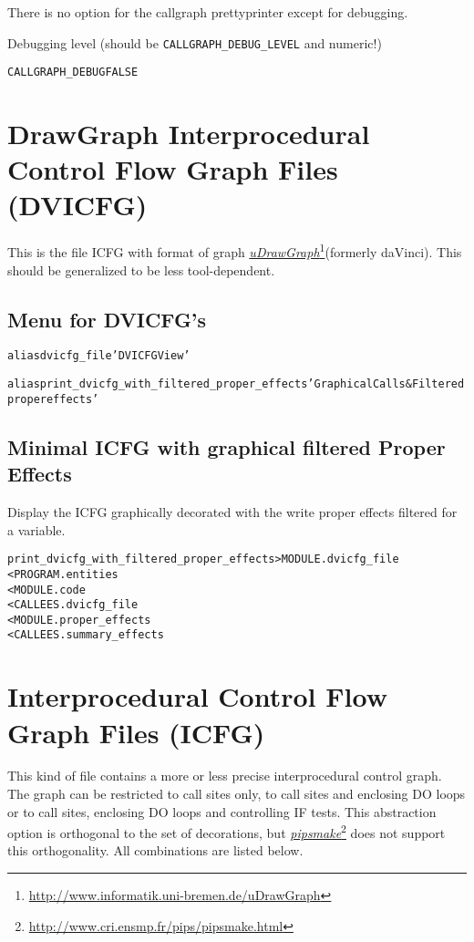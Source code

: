 \documentclass[a4paper]{report}
\newenvironment{PipsProp}{\begin{alltt}}{\end{alltt}}
\newenvironment{PipsMake}{\begin{alltt}}{\end{alltt}}
\newcommand{\LINK}[2]{\href{#2}{#1}\footnote{\url{#2}}\xspace}
\newcommand{\PIPSMAKE}{\LINK{\emph{pipsmake}}{http://www.cri.ensmp.fr/pips/pipsmake.html}\xspace}
\newcommand{\PuDrawGraph}{\LINK{\emph{uDrawGraph}}{http://www.informatik.uni-bremen.de/uDrawGraph}\xspace}
\begin{document}
There is no option for the callgraph prettyprinter except
for debugging.

Debugging level (should be \verb+CALLGRAPH_DEBUG_LEVEL+ and numeric!)

\begin{PipsProp}
CALLGRAPH_DEBUG FALSE
\end{PipsProp}

\section{DrawGraph Interprocedural Control Flow Graph Files (DVICFG)}

This is the file ICFG with format of graph \PuDrawGraph (formerly
daVinci). This should be generalized to be less tool-dependent.


\subsection{Menu for DVICFG's}
\begin{PipsMake}
alias dvicfg_file 'DVICFG View'

alias print_dvicfg_with_filtered_proper_effects 'Graphical Calls & Filtered proper effects'
\end{PipsMake}

\subsection{Minimal ICFG with graphical filtered Proper Effects}
Display the ICFG graphically decorated with the write proper effects filtered for a variable.
\begin{PipsMake}
print_dvicfg_with_filtered_proper_effects           > MODULE.dvicfg_file
        < PROGRAM.entities
        < MODULE.code
        < CALLEES.dvicfg_file
        < MODULE.proper_effects
        < CALLEES.summary_effects
\end{PipsMake}

\section{Interprocedural Control Flow Graph Files (ICFG)}

This kind of file contains a more or less precise interprocedural
control graph. The graph can be restricted to call sites only, to call
sites and enclosing DO loops or to call sites, enclosing DO loops and
controlling IF tests. This abstraction option is orthogonal to the set
of decorations, but \PIPSMAKE does not support this
orthogonality. All combinations are listed below.
\end{document}
